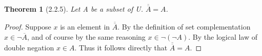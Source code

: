 \documentclass[a4paper, 12pt]{article}
\theoremstyle{plain}
\newtheorem*{theorem*}{Theorem}
\begin{document}
	
	\begin{theorem*}[2.2.5]
		Let A be a subset of U. $\overline{\overline{A}} = A$.
	\end{theorem*}
	
	\begin{proof}
		Suppose $x$ is an element in $\overline{\overline{A}}$. By the definition of set complementation $x \in \lnot \overline{A}$, and of course by the same reasoning $x \in \lnot ( \lnot A)$. By the logical law of double negation $x \in A$. Thus it follows directly that $\overline{\overline{A}} = A$.
	\end{proof}
\end{document}
